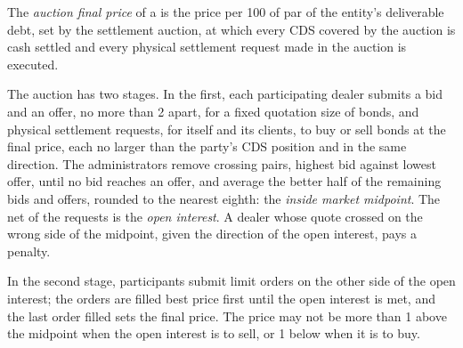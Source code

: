 \begin{definition}\label{def:m2:credit-default-swaps:final}
The \emph{auction final price} of a  is the
price per 100 of par of the entity's deliverable debt, set by the settlement
auction, at which every CDS covered by the auction is cash settled and every
physical settlement request made in the auction is executed.
\end{definition}

The auction has two stages. In the first, each participating dealer submits a bid
and an offer, no more than 2 apart, for a fixed quotation size of bonds, and
physical settlement requests, for itself and its clients, to buy or sell bonds at the
final price, each no larger than the party's CDS position and in the same direction.
The administrators remove crossing pairs, highest bid against lowest offer, until no
bid reaches an offer, and average the better half of the remaining bids and offers,
rounded to the nearest eighth: the \emph{inside market midpoint}. The net of the
requests is the \emph{open interest}. A dealer whose quote crossed on the wrong side
of the midpoint, given the direction of the open interest, pays a penalty.

In the second stage, participants submit limit orders on the other side of the open
interest; the orders are filled best price first until the open interest is met, and
the last order filled sets the final price. The price may not be more than 1 above the
midpoint when the open interest is to sell, or 1 below when it is to buy.

